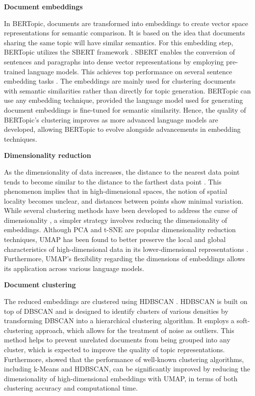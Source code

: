 \documentclass{article}
\begin{document}
\textbf{Document embeddings}

In BERTopic, documents are transformed into embeddings to create vector space representations for semantic comparison. It is based on the idea that documents sharing the same topic will have similar semantics. For this embedding step, BERTopic utilizes the SBERT framework \citet{reimers_sentence-bert_2019}. SBERT enables the conversion of sentences and paragraphs into dense vector representations by employing pre-trained language models. This achieves top performance on several sentence embedding tasks \cite{reimers_making_2020}. The embeddings are mainly used for clustering documents with semantic similarities rather than directly for topic generation. BERTopic can use any embedding technique, provided the language model used for generating document embeddings is fine-tuned for semantic similarity. Hence, the quality of BERTopic's clustering improves as more advanced language models are developed, allowing BERTopic to evolve alongside advancements in embedding techniques.

\textbf{Dimensionality reduction}

As the dimensionality of data increases, the distance to the nearest data point tends to become similar to the distance to the farthest data point \cite{aggarwal_surprising_2001, beyer_when_1999}. This phenomenon implies that in high-dimensional spaces, the notion of spatial locality becomes unclear, and distances between points show minimal variation. While several clustering methods have been developed to address the curse of dimensionality \cite{pandove_systematic_2018, steinbach_challenges_2004}, a simpler strategy involves reducing the dimensionality of embeddings. Although PCA and t-SNE are popular dimensionality reduction techniques, UMAP has been found to better preserve the local and global characteristics of high-dimensional data in its lower-dimensional representations \cite{mcinnes_umap_2020}. Furthermore, UMAP's flexibility regarding the dimensions of embeddings allows its application across various language models.

\textbf{Document clustering}

The reduced embeddings are clustered using HDBSCAN \cite{mcinnes_hdbscan_2017}. HDBSCAN is built on top of DBSCAN and is designed to identify clusters of various densities by transforming DBSCAN into a hierarchical clustering algorithm. It employs a soft-clustering approach, which allows for the treatment of noise as outliers. This method helps to prevent unrelated documents from being grouped into any cluster, which is expected to improve the quality of topic representations. Furthermore, \citet{allaoui_considerably_2020} showed that the performance of well-known clustering algorithms, including k-Means and HDBSCAN, can be significantly improved by reducing the dimensionality of high-dimensional embeddings with UMAP, in terms of both clustering accuracy and computational time.
\end{document}
